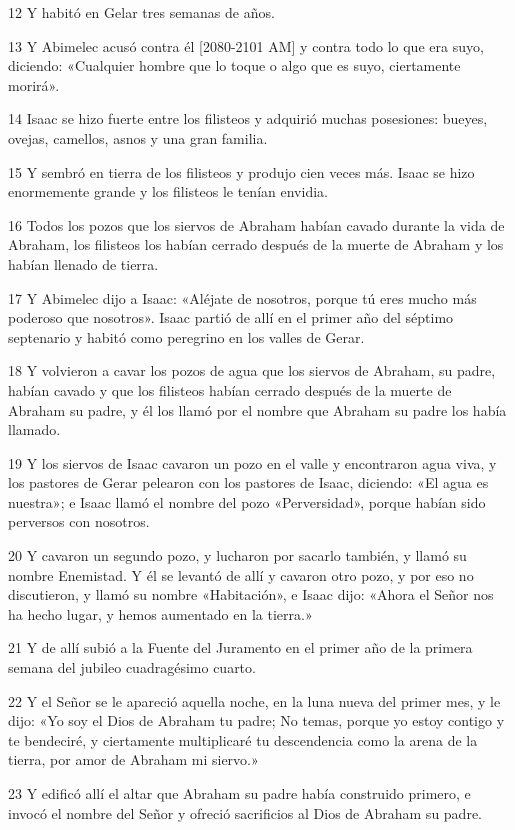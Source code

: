 \par 12 Y habitó en Gelar tres semanas de años.
\par 13 Y Abimelec acusó contra él [2080-2101 AM] y contra todo lo que era suyo, diciendo: «Cualquier hombre que lo toque o algo que es suyo, ciertamente morirá».
\par 14 Isaac se hizo fuerte entre los filisteos y adquirió muchas posesiones: bueyes, ovejas, camellos, asnos y una gran familia.
\par 15 Y sembró en tierra de los filisteos y produjo cien veces más. Isaac se hizo enormemente grande y los filisteos le tenían envidia.
\par 16 Todos los pozos que los siervos de Abraham habían cavado durante la vida de Abraham, los filisteos los habían cerrado después de la muerte de Abraham y los habían llenado de tierra.
\par 17 Y Abimelec dijo a Isaac: «Aléjate de nosotros, porque tú eres mucho más poderoso que nosotros». Isaac partió de allí en el primer año del séptimo septenario y habitó como peregrino en los valles de Gerar.
\par 18 Y volvieron a cavar los pozos de agua que los siervos de Abraham, su padre, habían cavado y que los filisteos habían cerrado después de la muerte de Abraham su padre, y él los llamó por el nombre que Abraham su padre los había llamado.
\par 19 Y los siervos de Isaac cavaron un pozo en el valle y encontraron agua viva, y los pastores de Gerar pelearon con los pastores de Isaac, diciendo: «El agua es nuestra»; e Isaac llamó el nombre del pozo «Perversidad», porque habían sido perversos con nosotros.
\par 20 Y cavaron un segundo pozo, y lucharon por sacarlo también, y llamó su nombre Enemistad. Y él se levantó de allí y cavaron otro pozo, y por eso no discutieron, y llamó su nombre «Habitación», e Isaac dijo: «Ahora el Señor nos ha hecho lugar, y hemos aumentado en la tierra.»
\par 21 Y de allí subió a la Fuente del Juramento en el primer año de la primera semana del jubileo cuadragésimo cuarto.
\par 22 Y el Señor se le apareció aquella noche, en la luna nueva del primer mes, y le dijo: «Yo soy el Dios de Abraham tu padre; No temas, porque yo estoy contigo y te bendeciré, y ciertamente multiplicaré tu descendencia como la arena de la tierra, por amor de Abraham mi siervo.»
\par 23 Y edificó allí el altar que Abraham su padre había construido primero, e invocó el nombre del Señor y ofreció sacrificios al Dios de Abraham su padre.
